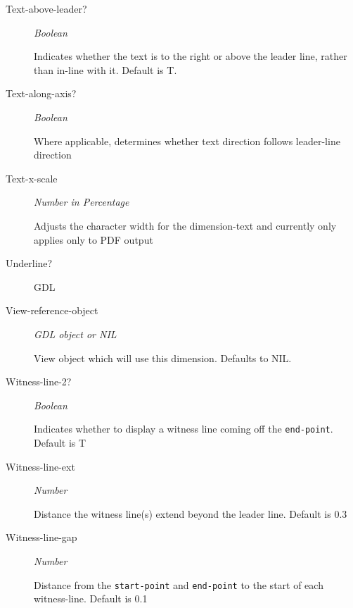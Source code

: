 \documentclass [11pt]{book}
\begin{document}
\begin{itemize}
\begin{description}
\item [Text-above-leader?]
\emph{Boolean}

 Indicates whether the text is to the right or above the leader line, rather than in-line with it. Default is T.




\item [Text-along-axis?]
\emph{Boolean}

 Where applicable, determines whether text direction follows leader-line direction




\item [Text-x-scale]
\emph{Number in Percentage}

 Adjusts the character width for the dimension-text and currently only applies only to PDF output




\item [Underline?]

GDL




\item [View-reference-object]
\emph{GDL object or NIL}

 View object which will use this dimension. Defaults to NIL.




\item [Witness-line-2?]
\emph{Boolean}

 Indicates whether to display a witness line coming off the \texttt{end-point}. Default is T




\item [Witness-line-ext]
\emph{Number}

 Distance the witness line(s) extend beyond the leader line. Default is 0.3




\item [Witness-line-gap]
\emph{Number}

 Distance from the \texttt{start-point} and \texttt{end-point} to the start of each witness-line. Default is 0.1





\end{description}
\end{itemize}
\end{document}
